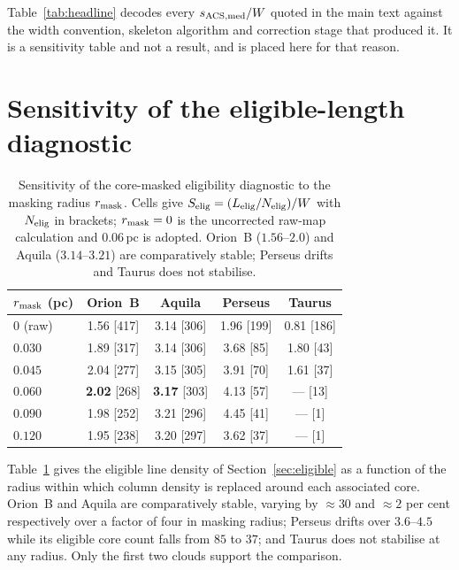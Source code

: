 \documentclass[usenatbib,twoside,twocolumn]{mnras}
\begin{document}
Table~\ref{tab:headline} decodes every $s_{\rm ACS,med}/W$ quoted in the main text against the width convention, skeleton algorithm and correction stage that produced it. It is a sensitivity table and not a result, and is placed here for that reason.

\section{Sensitivity of the eligible-length diagnostic}
\label{sec:maskapp}

\begin{table}
\caption{Sensitivity of the core-masked eligibility diagnostic to the masking radius $r_{\rm mask}$. Cells give $S_{\rm elig}=(L_{\rm elig}/N_{\rm elig})/W$ with $N_{\rm elig}$ in brackets; $r_{\rm mask}=0$ is the uncorrected raw-map calculation and $0.06$\,pc is adopted. Orion~B ($1.56$--$2.0$) and Aquila ($3.14$--$3.21$) are comparatively stable; Perseus drifts and Taurus does not stabilise.}
\label{tab:maskrad}
\footnotesize
\setlength{\tabcolsep}{4pt}
\begin{tabular}{lcccc}
\toprule
$r_{\rm mask}$ (pc) & Orion~B & Aquila & Perseus & Taurus \\
\midrule
$0$ (raw) & 1.56 [417] & 3.14 [306] & 1.96 [199] & 0.81 [186] \\
$0.030$   & 1.89 [317] & 3.14 [306] & 3.68 [85]  & 1.80 [43] \\
$0.045$   & 2.04 [277] & 3.15 [305] & 3.91 [70]  & 1.61 [37] \\
$0.060$   & \textbf{2.02} [268] & \textbf{3.17} [303] & 4.13 [57] & --- [13] \\
$0.090$   & 1.98 [252] & 3.21 [296] & 4.45 [41]  & --- [1] \\
$0.120$   & 1.95 [238] & 3.20 [297] & 3.62 [37]  & --- [1] \\
\bottomrule
\end{tabular}
\end{table}

Table~\ref{tab:maskrad} gives the eligible line density of Section~\ref{sec:eligible} as a function of the radius within which column density is replaced around each associated core. Orion~B and Aquila are comparatively stable, varying by $\approx30$ and $\approx2$ per cent respectively over a factor of four in masking radius; Perseus drifts over $3.6$--$4.5$ while its eligible core count falls from $85$ to $37$; and Taurus does not stabilise at any radius. Only the first two clouds support the comparison.
\end{document}
